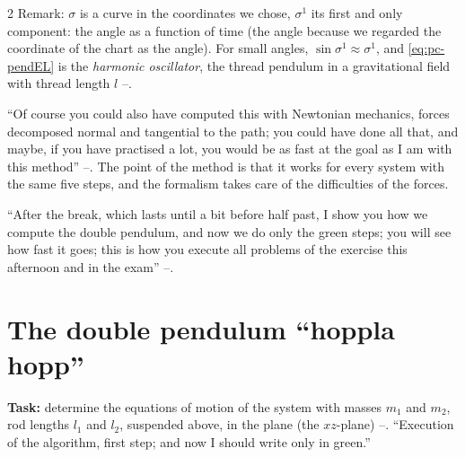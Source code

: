 \begin{paracol}{2}
Remark: $\sigma$ is a curve in the coordinates we chose, $\sigma^1$ its first and only component: the angle as a function of time (the angle because we regarded the coordinate of the chart as the angle). For small angles, $\sin\sigma^1\approx\sigma^1$, and \eqref{eq:pc-pendEL} is the \emph{harmonic oscillator}, the thread pendulum in a gravitational field with thread length $l$ --.

\begin{coursenote}\label{cn:pc-newton}
``Of course you could also have computed this with Newtonian mechanics, forces decomposed normal and tangential to the path; you could have done all that, and maybe, if you have practised a lot, you would be as fast at the goal as I am with this method'' --. The point of the method is that it works for every system with the same five steps, and the formalism takes care of the difficulties of the forces.
\end{coursenote}

``After the break, which lasts until a bit before half past, I show you how we compute the double pendulum, and now we do only the green steps; you will see how fast it goes; this is how you execute all problems of the exercise this afternoon and in the exam'' --.

\section{The double pendulum ``hoppla hopp''}\label{sec:pc-double}

\textbf{Task:} determine the equations of motion of the system with masses $m_1$ and $m_2$, rod lengths $l_1$ and $l_2$, suspended above, in the plane (the $xz$-plane) --. ``Execution of the algorithm, first step; and now I should write only in green.''

\begin{nfigure}
\caption*{The planar double pendulum, both angles measured from the downward vertical; the second rod hangs from the first mass.}
\end{nfigure}


\end{paracol}
